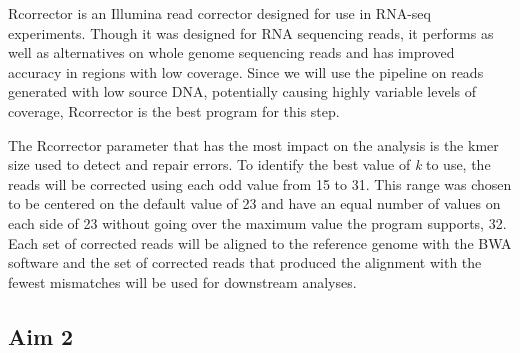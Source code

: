 Rcorrector is an Illumina read corrector designed for use in RNA-seq experiments. Though it was designed for RNA sequencing reads, it performs as well as alternatives on whole genome sequencing reads and has improved accuracy in regions with low coverage. Since we will use the pipeline on reads generated with low source DNA, potentially causing highly variable levels of coverage, Rcorrector is the best program for this step.

The Rcorrector parameter that has the most impact on the analysis is the kmer size used to detect and repair errors. To identify the best value of \textit{k} to use, the reads will be corrected using each odd value from 15 to 31. This range was chosen to be centered on the default value of 23 and have an equal number of values on each side of 23 without going over the maximum value the program supports, 32. Each set of corrected reads will be aligned to the reference genome with the BWA software and the set of corrected reads that produced the alignment with the fewest mismatches will be used for downstream analyses.





\subsection{Aim 2}


